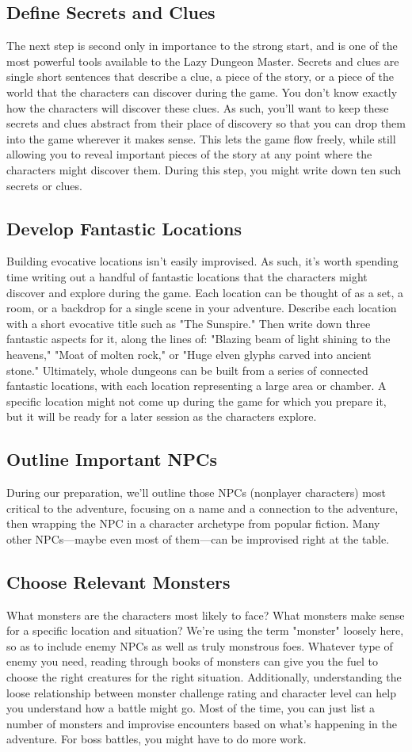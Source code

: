 \documentclass[10pt,a4paper,twoside,bg=print,twocolumn,openany,nodeprecatedcode]{dndbook}
\begin{document}
\subsection{Define Secrets and Clues}
The next step is second only in importance to the strong start, and is one of the most powerful tools available to the Lazy Dungeon Master. Secrets and clues are single short sentences that describe a clue, a piece of the story, or a piece of the world that the characters can discover during the game. You don't know exactly how the characters will discover these clues. As such, you'll want to keep these secrets and clues abstract from their place of discovery so that you can drop them into the game wherever it makes sense. This lets the game flow freely, while still allowing you to reveal important pieces of the story at any point where the characters might discover them. During this step, you might write down ten such secrets or clues.
\subsection{Develop Fantastic Locations}
Building evocative locations isn't easily improvised. As such, it's worth spending time writing out a handful of fantastic locations that the characters might discover and explore during the game. Each location can be thought of as a set, a room, or a backdrop for a single scene in your adventure.
Describe each location with a short evocative title such as "The Sunspire." Then write down three fantastic aspects for it, along the lines of: "Blazing beam of light shining to the heavens," "Moat of molten rock," or "Huge elven glyphs carved into ancient stone." Ultimately, whole dungeons can be built from a series of connected fantastic locations, with each location representing a large area or chamber. A specific location might not come up during the game for which you prepare it, but it will be ready for a later session as the characters explore.
\subsection{Outline Important NPCs}
During our preparation, we'll outline those NPCs (nonplayer characters) most critical to the adventure, focusing on a name and a connection to the adventure, then wrapping the NPC in a character archetype from popular fiction. Many other NPCs—maybe even most of them—can be improvised right at the table.
\subsection{Choose Relevant Monsters}
What monsters are the characters most likely to face? What monsters make sense for a specific location and situation? We're using the term "monster" loosely here, so as to include enemy NPCs as well as truly monstrous foes. Whatever type of enemy you need, reading through books of monsters can give you the fuel to choose the right creatures for the right situation.
Additionally, understanding the loose relationship between monster challenge rating and character level can help you understand how a battle might go. Most of the time, you can just list a number of monsters and improvise encounters based on what's happening in the adventure. For boss battles, you might have to do more work.
\end{document}

